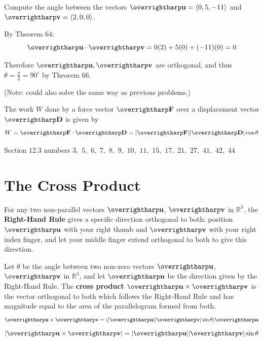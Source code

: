 \documentclass[letterpaper, twoside, 12pt]{book}
\begin{document}
          \begin{problem}
            Compute the angle between the vectors
            $\harpvec{u}=\<0,5,-11\>$ and $\harpvec{v}=\<2,0,0\>$.
          \end{problem}

          \begin{solution}
            By Theorem 64:
            \[
              \vect{u}\cdot\vect{v}
                =
              0(2)+5(0)+(-11)(0)
                =
              0
            \]

            Therefore $\vect{u},\vect{v}$ are orthogonal,
            and thus $\theta=\frac{\pi}{2}=90^\circ$ by Theorem 66.

            (Note: could also solve the same way as previous problems.)
          \end{solution}



\begin{definition}
The work $W$ done by a force vector $\harpvec{F}$ over a displacement
vector $\harpvec{D}$ is given by
\[
  W = \harpvec{F} \cdot \harpvec{D}
    =
  |\harpvec{F}||\harpvec{D}|\cos \theta
\]
\end{definition}

\begin{suggestedHW}
Section $12.3$ numbers
$3,$ $5,$ $6,$ $7,$ $8,$ $9,$ $10,$ $11,$ $15,$ $17,$
$21,$ $27,$ $41,$ $42,$ $44$
\end{suggestedHW}





\section{The Cross Product}

\begin{definition}
  For any two non-parallel vectors $\harpvec{u}$, $\harpvec{v}$ in $\mathbb R^3$,
  the \textbf{Right-Hand Rule} gives a specific direction orthogonal to both:
  position $\harpvec{u}$ with your right thumb and $\harpvec{v}$ with your
  right index finger, and let your middle finger extend orthogonal to both
  to give this direction.
\end{definition}

\begin{definition}
  Let $\theta$ be the angle between two non-zero vectors $\harpvec{u}$,
  $\harpvec{v}$ in $\mathbb{R}^3$, and let $\harpvec{n}$ be the direction
  given by the Right-Hand Rule.
  The \textbf{cross product} $\harpvec{u}\times\harpvec{v}$ is the vector
  orthogonal to both which follows the Right-Hand Rule and has magnitude
  equal to the area of the parallelogram formed from both.
  \[
    \harpvec{u}\times\harpvec{v}
      =
    (|\harpvec{u}||\harpvec{v}|\sin\theta)\harpvec{n}
  \]
  \[
    |\harpvec{u}\times\harpvec{v}|
      =
    |\harpvec{u}||\harpvec{v}|\sin\theta
  \]
\end{definition}
\end{document}
